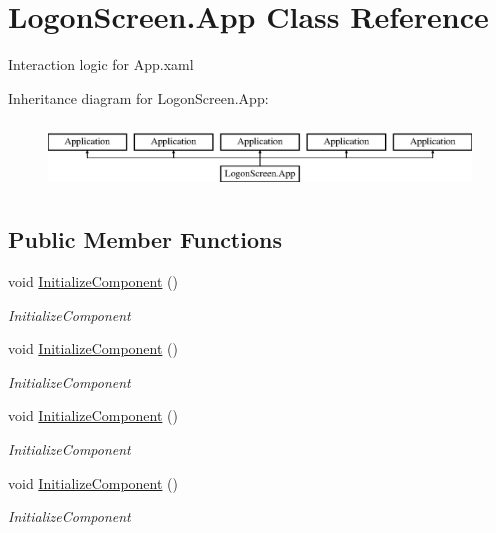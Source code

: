 \hypertarget{class_logon_screen_1_1_app}{}\section{Logon\+Screen.\+App Class Reference}
\label{class_logon_screen_1_1_app}


Interaction logic for App.\+xaml  


Inheritance diagram for Logon\+Screen.\+App\+:\begin{figure}[H]
\begin{center}
\leavevmode
\includegraphics[height=1.821138cm]{d4/d0e/class_logon_screen_1_1_app}
\end{center}
\end{figure}
\subsection*{Public Member Functions}
\begin{DoxyCompactItemize}
\item 
void \mbox{\hyperlink{class_logon_screen_1_1_app_a928f2912daa0652adcdfe26e81beecdc}{Initialize\+Component}} ()
\begin{DoxyCompactList}\small\item\em Initialize\+Component \end{DoxyCompactList}\item 
void \mbox{\hyperlink{class_logon_screen_1_1_app_a928f2912daa0652adcdfe26e81beecdc}{Initialize\+Component}} ()
\begin{DoxyCompactList}\small\item\em Initialize\+Component \end{DoxyCompactList}\item 
void \mbox{\hyperlink{class_logon_screen_1_1_app_a928f2912daa0652adcdfe26e81beecdc}{Initialize\+Component}} ()
\begin{DoxyCompactList}\small\item\em Initialize\+Component \end{DoxyCompactList}\item 
void \mbox{\hyperlink{class_logon_screen_1_1_app_a928f2912daa0652adcdfe26e81beecdc}{Initialize\+Component}} ()
\begin{DoxyCompactList}\small\item\em Initialize\+Component \end{DoxyCompactList}\end{DoxyCompactItemize}
